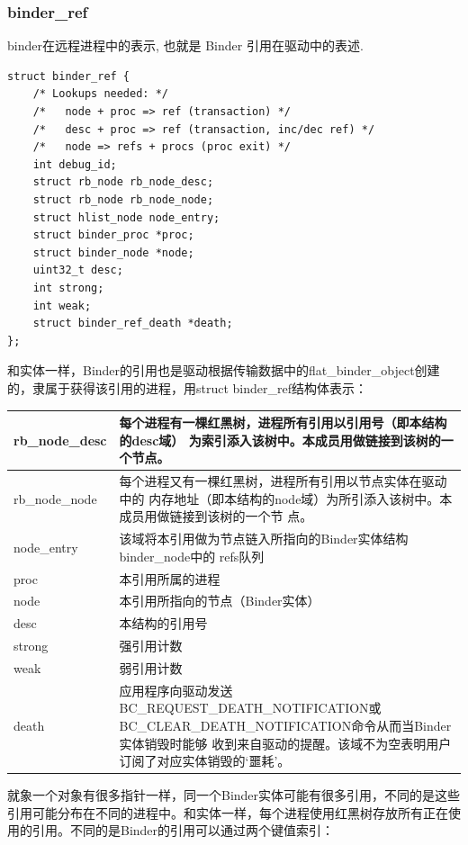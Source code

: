 \documentclass[a4paper,11pt]{article}
\begin{document}
 \subsubsection{binder_ref}
 binder在远程进程中的表示, 也就是 Binder 引用在驱动中的表述.
     \begin{lstlisting}[language=KC, multicols=2]
struct binder_ref {
	/* Lookups needed: */
	/*   node + proc => ref (transaction) */
	/*   desc + proc => ref (transaction, inc/dec ref) */
	/*   node => refs + procs (proc exit) */
	int debug_id;
	struct rb_node rb_node_desc;
	struct rb_node rb_node_node;
	struct hlist_node node_entry;
	struct binder_proc *proc;
	struct binder_node *node;
	uint32_t desc;
	int strong;
	int weak;
	struct binder_ref_death *death;
};
\end{lstlisting}
  和实体一样，Binder的引用也是驱动根据传输数据中的flat_binder_object创建的，隶属于获得该引用的进程，用struct binder_ref结构体表示：

\begin{longtable}{|p{}|p{}|}\hline
    rb_node_desc & 每个进程有一棵红黑树，进程所有引用以引用号（即本结构的desc域）
    为索引添入该树中。本成员用做链接到该树的一个节点。\\\hline
    rb_node_node & 每个进程又有一棵红黑树，进程所有引用以节点实体在驱动中的
    内存地址（即本结构的node域）为所引添入该树中。本成员用做链接到该树的一个节
    点。\\\hline
    node_entry & 该域将本引用做为节点链入所指向的Binder实体结构binder_node中的
    refs队列 \\\hline
    proc & 本引用所属的进程 \\\hline 
    node & 本引用所指向的节点（Binder实体）\\\hline
    desc & 本结构的引用号 \\\hline
    strong & 强引用计数 \\\hline
    weak & 弱引用计数 \\\hline
    death & 应用程序向驱动发送BC_REQUEST_DEATH_NOTIFICATION或
    BC_CLEAR_DEATH_NOTIFICATION命令从而当Binder实体销毁时能够
    收到来自驱动的提醒。该域不为空表明用户订阅了对应实体销毁的‘噩耗’。\\\hline
\end{longtable}

就象一个对象有很多指针一样，同一个Binder实体可能有很多引用，不同的是这些引用可能分布在不同的进程中。和实体一样，每个进程使用红黑树存放所有正在使用的引用。不同的是Binder的引用可以通过两个键值索引：
\end{document}
